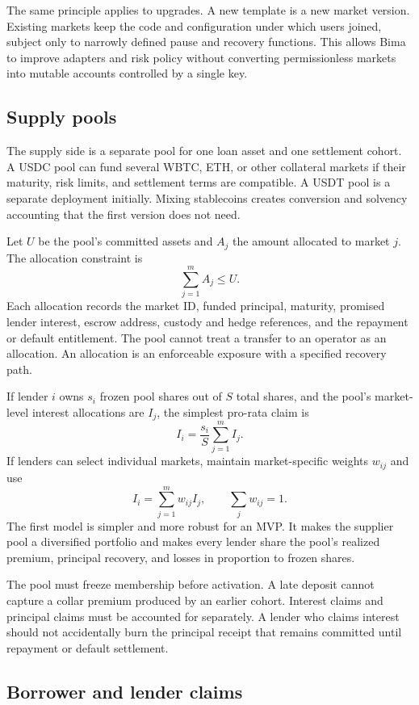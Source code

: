 \documentclass[11pt,oneside]{article}
\begin{document}
The same principle applies to upgrades. A new template is a new market
version. Existing markets keep the code and configuration under which users
joined, subject only to narrowly defined pause and recovery functions. This
allows Bima to improve adapters and risk policy without converting
permissionless markets into mutable accounts controlled by a single key.

\subsection{Supply pools}

The supply side is a separate pool for one loan asset and one settlement cohort. A USDC pool can fund several WBTC, ETH, or other collateral markets if their maturity, risk limits, and settlement terms are compatible. A USDT pool is a separate deployment initially. Mixing stablecoins creates conversion and solvency accounting that the first version does not need.

Let $U$ be the pool's committed assets and $A_j$ the amount allocated to market $j$. The allocation constraint is
\[
\sum_{j=1}^{m} A_j\leq U.
\]
Each allocation records the market ID, funded principal, maturity, promised lender interest, escrow address, custody and hedge references, and the repayment or default entitlement. The pool cannot treat a transfer to an operator as an allocation. An allocation is an enforceable exposure with a specified recovery path.

If lender $i$ owns $s_i$ frozen pool shares out of $S$ total shares, and the pool's market-level interest allocations are $I_j$, the simplest pro-rata claim is
\[
I_i=\frac{s_i}{S}\sum_{j=1}^{m}I_j.
\]
If lenders can select individual markets, maintain market-specific weights $w_{ij}$ and use
\[
I_i=\sum_{j=1}^{m} w_{ij} I_j,
\qquad \sum_j w_{ij}=1.
\]
The first model is simpler and more robust for an MVP. It makes the supplier pool a diversified portfolio and makes every lender share the pool's realized premium, principal recovery, and losses in proportion to frozen shares.

The pool must freeze membership before activation. A late deposit cannot capture a collar premium produced by an earlier cohort. Interest claims and principal claims must be accounted for separately. A lender who claims interest should not accidentally burn the principal receipt that remains committed until repayment or default settlement.

\subsection{Borrower and lender claims}
\end{document}
